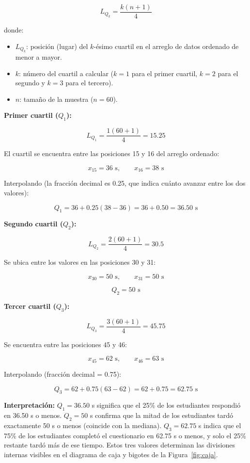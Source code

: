\documentclass[12pt,letterpaper]{article}
\begin{document}
\[
L_{Q_k}=\frac{k(n+1)}{4}
\]

donde:
\begin{itemize}[leftmargin=1.2cm]
    \item $L_{Q_k}$: posición (lugar) del $k$-ésimo cuartil en el arreglo de datos ordenado de menor a mayor.
    \item $k$: número del cuartil a calcular ($k = 1$ para el primer cuartil, $k = 2$ para el segundo y $k = 3$ para el tercero).
    \item $n$: tamaño de la muestra ($n = 60$).
\end{itemize}

\textbf{Primer cuartil ($Q_1$):}

\[
L_{Q_1}=\frac{1(60+1)}{4}=15.25
\]

El cuartil se encuentra entre las posiciones 15 y 16 del arreglo ordenado:

\[
x_{15}=36 \text{ s},\qquad x_{16}=38 \text{ s}
\]

Interpolando (la fracción decimal es 0.25, que indica cuánto avanzar entre los dos valores):

\[
Q_1=36+0.25(38-36)=36+0.50=36.50 \text{ s}
\]

\textbf{Segundo cuartil ($Q_2$):}

\[
L_{Q_2}=\frac{2(60+1)}{4}=30.5
\]

Se ubica entre los valores en las posiciones 30 y 31:

\[
x_{30}=50 \text{ s},\qquad x_{31}=50 \text{ s}
\]

\[
Q_2=50 \text{ s}
\]

\textbf{Tercer cuartil ($Q_3$):}

\[
L_{Q_3}=\frac{3(60+1)}{4}=45.75
\]

Se encuentra entre las posiciones 45 y 46:

\[
x_{45}=62 \text{ s},\qquad x_{46}=63 \text{ s}
\]

Interpolando (fracción decimal = 0.75):

\[
Q_3=62+0.75(63-62)=62+0.75=62.75 \text{ s}
\]

\textbf{Interpretación:} $Q_1 = 36.50$ s significa que el 25\% de los estudiantes respondió en 36.50 s o menos. $Q_2 = 50$ s confirma que la mitad de los estudiantes tardó exactamente 50 s o menos (coincide con la mediana). $Q_3 = 62.75$ s indica que el 75\% de los estudiantes completó el cuestionario en 62.75 s o menos, y solo el 25\% restante tardó más de ese tiempo. Estos tres valores determinan las divisiones internas visibles en el diagrama de caja y bigotes de la Figura~\ref{fig:caja}.
\end{document}
